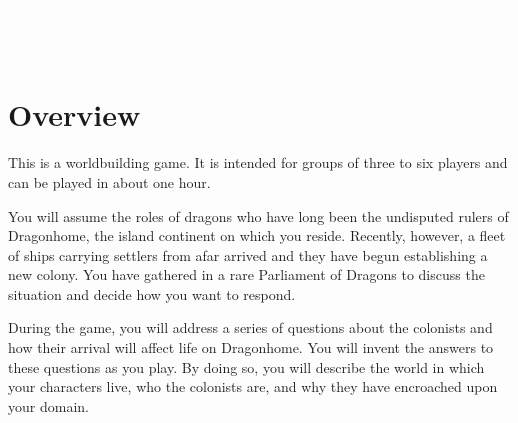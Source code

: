 \documentclass[a6paper, 11pt, parskip=half, DIV=15]{scrartcl}
\begin{document}
\begin{titlepage}

\enlargethispage{3.0\baselineskip}
\Huge
\vspace*{-1.0\baselineskip}
{
\setmainfont[Scale=2.2375]{Oi}
\begin{center}
\textcolor{white}{Aloft}
\end{center}
}
\vfill
\huge
\setmainfont[Scale=1.05]{Playball}
\begin{center}
\textcolor{white}{Designed by Michael Purcell}
\end{center}
\end{titlepage}
%
\ClearShipoutPicture
\enlargethispage{3.5\baselineskip}
\section*{Overview}
This is a worldbuilding game. It is intended for groups of three to six players and can be played in about one hour.

You will assume the roles of dragons who have long been the undisputed rulers of Dragonhome, the island continent on which you reside. Recently, however, a fleet of ships carrying settlers from afar arrived and they have begun establishing a new colony. You have gathered in a rare Parliament of Dragons to discuss the situation and decide how you want to respond.

During the game, you will address a series of questions about the colonists and how their arrival will affect life on Dragonhome. You will invent the answers to these questions as you play. By doing so, you will describe the world in which your characters live, who the colonists are, and why they have encroached upon your domain.


\newpage
\enlargethispage{1.75\baselineskip}
\end{document}

